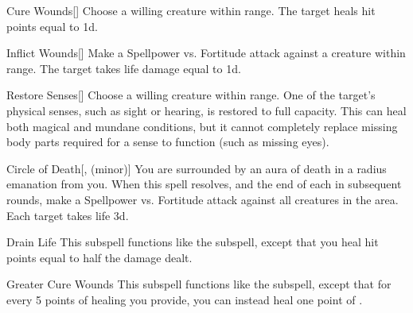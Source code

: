 \begin{ability}[\nth{1}]{Cure Wounds}[]
Choose a willing creature within \rngmed range.
The target heals hit points equal to  \plus1d.
\end{ability}
\vspace{0.25em}


\begin{ability}[\nth{1}]{Inflict Wounds}[]
Make a Spellpower vs. Fortitude attack against a creature within \rngmed range.
\hit The target takes life damage equal to  \plus1d.
\end{ability}
\vspace{0.25em}


\begin{ability}[\nth{2}]{Restore Senses}[]
Choose a willing creature within \rngclose range.
One of the target's physical senses, such as sight or hearing, is restored to full capacity.
This can heal both magical and mundane conditions, but it cannot completely replace missing body parts required for a sense to function (such as missing eyes).
\end{ability}
\vspace{0.25em}


\begin{ability}[\nth{3}]{Circle of Death}[,  (minor)]
You are surrounded by an aura of death in a \areamed radius emanation from you.
When this spell resolves, and the end of each  in subsequent rounds, make a Spellpower vs. Fortitude attack against all creatures in the area.
\hit Each target takes life  \minus3d.
\end{ability}
\vspace{0.25em}


\begin{ability}[\nth{3}]{Drain Life}
This subspell functions like the  subspell, except that you heal hit points equal to half the damage dealt.
\end{ability}
\vspace{0.25em}


\begin{ability}[\nth{3}]{Greater Cure Wounds}
This subspell functions like the  subspell, except that for every 5 points of healing you provide, you can instead heal one point of .
\end{ability}
\vspace{0.25em}


